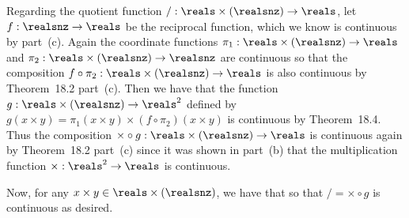 {{    Regarding the quotient function $/: \reals \times (\realsnz) \to \reals$, let $f: \realsnz \to \reals$ be the reciprocal function, which we know is continuous by part~(c).
    Again the coordinate functions $\pi_1: \reals \times (\realsnz) \to \reals$ and $\pi_2: \reals \times (\realsnz) \to \realsnz$ are continuous so that the composition $f \circ \pi_2: \reals \times (\realsnz) \to \reals$ is also continuous by Theorem~18.2 part~(c).
    Then we have that the function $g: \reals \times (\realsnz) \to \reals^2$ defined by $g(x \times y) = \pi_1(x \times y) \times (f \circ \pi_2)(x \times y)$ is continuous by Theorem~18.4.
    Thus the composition $\times \circ g : \reals \times (\realsnz) \to \reals$ is continuous again by Theorem~18.2 part~(c) since it was shown in part~(b) that the multiplication function $\times: \reals^2 \to \reals$ is continuous.

    Now, for any $x \times y \in \reals \times (\realsnz)$, we have that
    so that $/ = \times \circ g$ is continuous as desired.
  }
}
